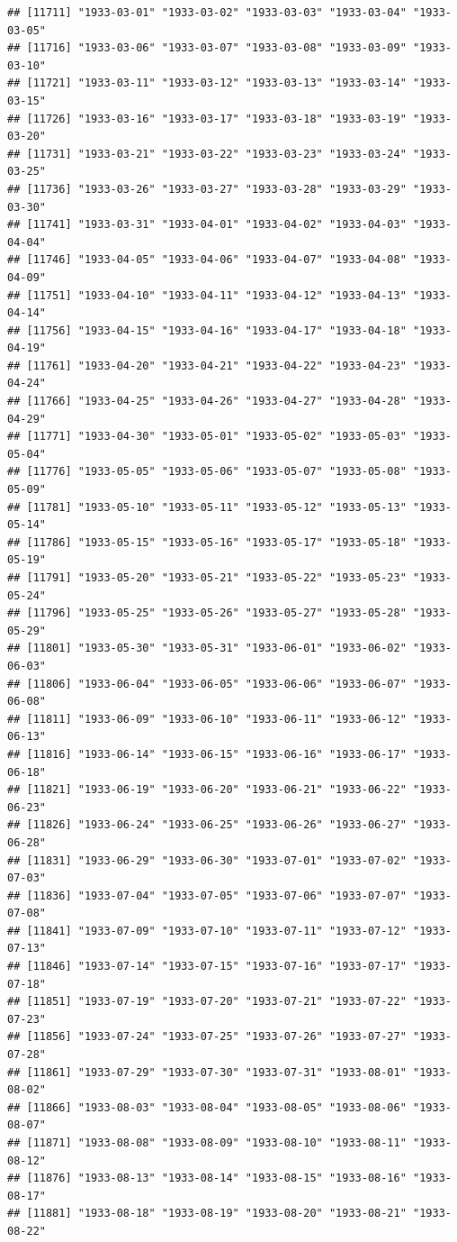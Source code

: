 \documentclass{article}\usepackage[]{graphicx}\usepackage[]{color}
\makeatletter
\newenvironment{kframe}{%
 \def\at@end@of@kframe{}%
 \ifinner\ifhmode%
  \def\at@end@of@kframe{\end{minipage}}%
  \begin{minipage}{\columnwidth}%
 \fi\fi%
 \def\FrameCommand##1{\hskip\@totalleftmargin \hskip-\fboxsep
 \colorbox{shadecolor}{##1}\hskip-\fboxsep
     \hskip-\linewidth \hskip-\@totalleftmargin \hskip\columnwidth}%
 \MakeFramed {\advance\hsize-\width
   \@totalleftmargin\z@ \linewidth\hsize
   \@setminipage}}%
 {\par\unskip\endMakeFramed%
 \at@end@of@kframe}
\newenvironment{knitrout}{}{} %
\makeatother
\begin{document}
\begin{description}
\begin{knitrout}
\begin{kframe}
\begin{verbatim}
## [11711] "1933-03-01" "1933-03-02" "1933-03-03" "1933-03-04" "1933-03-05"
## [11716] "1933-03-06" "1933-03-07" "1933-03-08" "1933-03-09" "1933-03-10"
## [11721] "1933-03-11" "1933-03-12" "1933-03-13" "1933-03-14" "1933-03-15"
## [11726] "1933-03-16" "1933-03-17" "1933-03-18" "1933-03-19" "1933-03-20"
## [11731] "1933-03-21" "1933-03-22" "1933-03-23" "1933-03-24" "1933-03-25"
## [11736] "1933-03-26" "1933-03-27" "1933-03-28" "1933-03-29" "1933-03-30"
## [11741] "1933-03-31" "1933-04-01" "1933-04-02" "1933-04-03" "1933-04-04"
## [11746] "1933-04-05" "1933-04-06" "1933-04-07" "1933-04-08" "1933-04-09"
## [11751] "1933-04-10" "1933-04-11" "1933-04-12" "1933-04-13" "1933-04-14"
## [11756] "1933-04-15" "1933-04-16" "1933-04-17" "1933-04-18" "1933-04-19"
## [11761] "1933-04-20" "1933-04-21" "1933-04-22" "1933-04-23" "1933-04-24"
## [11766] "1933-04-25" "1933-04-26" "1933-04-27" "1933-04-28" "1933-04-29"
## [11771] "1933-04-30" "1933-05-01" "1933-05-02" "1933-05-03" "1933-05-04"
## [11776] "1933-05-05" "1933-05-06" "1933-05-07" "1933-05-08" "1933-05-09"
## [11781] "1933-05-10" "1933-05-11" "1933-05-12" "1933-05-13" "1933-05-14"
## [11786] "1933-05-15" "1933-05-16" "1933-05-17" "1933-05-18" "1933-05-19"
## [11791] "1933-05-20" "1933-05-21" "1933-05-22" "1933-05-23" "1933-05-24"
## [11796] "1933-05-25" "1933-05-26" "1933-05-27" "1933-05-28" "1933-05-29"
## [11801] "1933-05-30" "1933-05-31" "1933-06-01" "1933-06-02" "1933-06-03"
## [11806] "1933-06-04" "1933-06-05" "1933-06-06" "1933-06-07" "1933-06-08"
## [11811] "1933-06-09" "1933-06-10" "1933-06-11" "1933-06-12" "1933-06-13"
## [11816] "1933-06-14" "1933-06-15" "1933-06-16" "1933-06-17" "1933-06-18"
## [11821] "1933-06-19" "1933-06-20" "1933-06-21" "1933-06-22" "1933-06-23"
## [11826] "1933-06-24" "1933-06-25" "1933-06-26" "1933-06-27" "1933-06-28"
## [11831] "1933-06-29" "1933-06-30" "1933-07-01" "1933-07-02" "1933-07-03"
## [11836] "1933-07-04" "1933-07-05" "1933-07-06" "1933-07-07" "1933-07-08"
## [11841] "1933-07-09" "1933-07-10" "1933-07-11" "1933-07-12" "1933-07-13"
## [11846] "1933-07-14" "1933-07-15" "1933-07-16" "1933-07-17" "1933-07-18"
## [11851] "1933-07-19" "1933-07-20" "1933-07-21" "1933-07-22" "1933-07-23"
## [11856] "1933-07-24" "1933-07-25" "1933-07-26" "1933-07-27" "1933-07-28"
## [11861] "1933-07-29" "1933-07-30" "1933-07-31" "1933-08-01" "1933-08-02"
## [11866] "1933-08-03" "1933-08-04" "1933-08-05" "1933-08-06" "1933-08-07"
## [11871] "1933-08-08" "1933-08-09" "1933-08-10" "1933-08-11" "1933-08-12"
## [11876] "1933-08-13" "1933-08-14" "1933-08-15" "1933-08-16" "1933-08-17"
## [11881] "1933-08-18" "1933-08-19" "1933-08-20" "1933-08-21" "1933-08-22"

\end{verbatim}
\end{kframe}
\end{knitrout}
\end{description}
\end{document}
